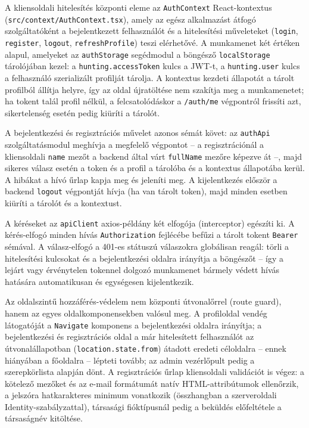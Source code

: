 A kliensoldali hitelesítés központi eleme az \texttt{AuthContext} React-kontextus
(\texttt{src/context/AuthContext.tsx}), amely az egész alkalmazást átfogó szolgáltatóként a
bejelentkezett felhasználót és a hitelesítési műveleteket (\texttt{login}, \texttt{register},
\texttt{logout}, \texttt{refreshProfile}) teszi elérhetővé. A munkamenet két értéken alapul,
amelyeket az \texttt{authStorage} segédmodul a böngésző \texttt{localStorage} tárolójában kezel: a
\texttt{hunting.accessToken} kulcs a JWT-t, a \texttt{hunting.user} kulcs a felhasználó
szerializált profilját tárolja. A kontextus kezdeti állapotát a tárolt profilból állítja helyre,
így az oldal újratöltése nem szakítja meg a munkamenetet; ha tokent talál profil nélkül, a
felcsatolódáskor a \texttt{/auth/me} végpontról frissíti azt, sikertelenség esetén pedig kiüríti a
tárolót.

A bejelentkezési és regisztrációs művelet azonos sémát követ: az \texttt{authApi} szolgáltatásmodul
meghívja a megfelelő végpontot -- a regisztrációnál a kliensoldali \texttt{name} mezőt a backend
által várt \texttt{fullName} mezőre képezve át --, majd sikeres válasz esetén a token és a profil a
tárolóba és a kontextus állapotába kerül. A hibákat a hívó űrlap kapja meg és jeleníti meg. A
kijelentkezés először a backend \texttt{logout} végpontját hívja (ha van tárolt token), majd minden
esetben kiüríti a tárolót és a kontextust.

A kéréseket az \texttt{apiClient} axios-példány két elfogója (interceptor) egészíti ki. A
kérés-elfogó minden hívás \texttt{Authorization} fejlécébe befűzi a tárolt tokent
\texttt{Bearer} sémával. A válasz-elfogó a 401-es státuszú válaszokra globálisan reagál: törli a
hitelesítési kulcsokat és a bejelentkezési oldalra irányítja a böngészőt -- így a lejárt vagy
érvénytelen tokennel dolgozó munkamenet bármely védett hívás hatására automatikusan és egységesen
kijelentkezik.

Az oldalszintű hozzáférés-védelem nem központi útvonalőrrel (route guard), hanem az egyes
oldalkomponensekben valósul meg. A profiloldal vendég látogatóját a \texttt{Navigate} komponens a
bejelentkezési oldalra irányítja; a bejelentkezési és regisztrációs oldal a már hitelesített
felhasználót az útvonalállapotban (\texttt{location.state.from}) átadott eredeti céloldalra --
ennek hiányában a főoldalra -- lépteti tovább; az admin vezérlőpult pedig a szerepkörlista alapján
dönt. A regisztrációs űrlap kliensoldali validációt is végez: a kötelező mezőket és az e-mail
formátumát natív HTML-attribútumok ellenőrzik, a jelszóra hatkarakteres minimum vonatkozik
(összhangban a szerveroldali Identity-szabályzattal), társasági fióktípusnál pedig a beküldés
előfeltétele a társaságnév kitöltése.

